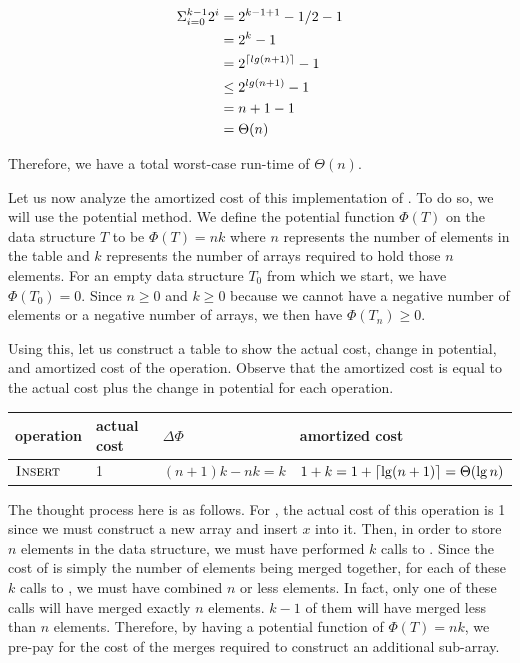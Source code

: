 \documentclass[11pt]{article}
\DeclarePairedDelimiter{\ceil}{\lceil}{\rceil}
\begin{document}
\hspace*{3mm}
\begin{equation}
\begin{split}
\Sigma_{i=0}^{k-1}{2^i} &= 2^{k-1+1} - 1 / 2 - 1\\
                        &= 2^k - 1\\
                        &= 2^{\ceil{lg(n+1)}} - 1\\
                        &\leq 2^{lg(n+1)} - 1\\
                        &= n+1-1\\
                        &= \Theta(n)
\end{split}
\end{equation}

Therefore, we have a total worst-case run-time of $\Theta(n)$.

Let us now analyze the amortized cost of this implementation of . To do so, we will use the potential method. We define the potential function $\Phi(T)$ on the data structure $T$ to be $\Phi(T) = nk$ where $n$ represents the number of elements in the table and $k$ represents the number of arrays required to hold those $n$ elements. For an empty data structure $T_0$ from which we start, we have $\Phi(T_0) = 0$. Since $n \geq 0$ and $k \geq 0$ because we cannot have a negative number of elements or a negative number of arrays, we then have $\Phi(T_n) \geq 0$.

Using this, let us construct a table to show the actual cost, change in potential, and amortized cost of the  operation. Observe that the amortized cost is equal to the actual cost plus the change in potential for each operation.

\begin{table}[H]
\begin{tabular}{l|l|l|l}
operation                   & actual cost & $\Delta \Phi$     & amortized cost \\ \hline
$\textnormal{\scshape Insert}$             & 1                & $(n+1)k - nk = k$                             & $1 + k = 1 + \ceil{\lg(n+1)} = \Theta(\lg{n})$
\end{tabular}
\end{table}

The thought process here is as follows. For , the actual cost of this operation is 1 since we must construct a new array and insert $x$ into it. Then, in order to store $n$ elements in the data structure, we must have performed $k$ calls to . Since the cost of  is simply the number of elements being merged together, for each of these $k$ calls to , we must have combined $n$ or less elements. In fact, only one of these calls will have merged exactly $n$ elements. $k - 1$ of them will have merged less than $n$ elements. Therefore, by having a potential function of $\Phi(T) = nk$, we pre-pay for the cost of the merges required to construct an additional sub-array.
\end{document}
